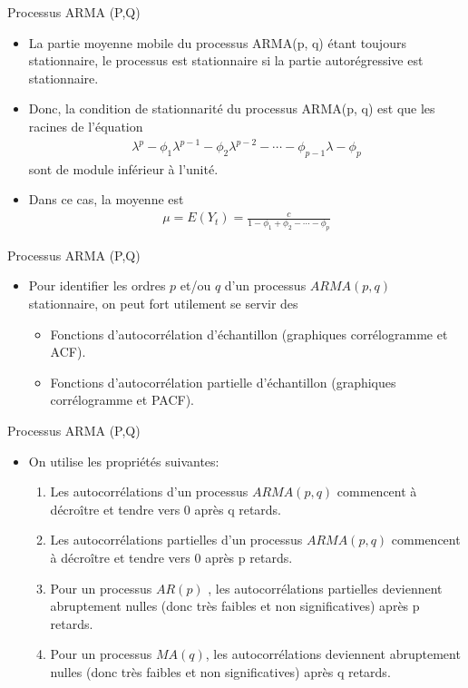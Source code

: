 \documentclass{beamer}
\begin{document}
\begin{frame}{Processus ARMA (P,Q)}
\begin{itemize}
\item La partie moyenne mobile du processus ARMA(p, q) étant toujours stationnaire, le processus est stationnaire si la partie autorégressive est stationnaire.
\item Donc, la condition de stationnarité du processus ARMA(p, q) est que les racines de l’équation
\begin{align*}
\lambda^p-\phi_1\lambda^{p-1}-\phi_2\lambda^{p-2}-\cdots -\phi_{p-1}\lambda-\phi_p
\end{align*}
sont de module inférieur à l’unité.
\item Dans ce cas, la moyenne est 
\begin{align*}
\mu=E(Y_t)=\frac{c}{1-\phi_1+\phi_2-\cdots-\phi_p}
\end{align*}
\end{itemize}
\end{frame}


\begin{frame}{Processus ARMA (P,Q)}
\begin{itemize}
\item Pour identifier les ordres $p$ et/ou $q$ d’un processus $ARMA(p,q)$ stationnaire, on peut fort utilement se servir des 
\begin{itemize}
\item Fonctions d’autocorrélation d’échantillon (graphiques corrélogramme et ACF). 
\item Fonctions d’autocorrélation partielle d’échantillon (graphiques corrélogramme et PACF). 

\end{itemize}
\end{itemize}
\end{frame}

\begin{frame}{Processus ARMA (P,Q)}
\begin{itemize}
\item On utilise les propriétés suivantes:
\begin{enumerate}
\item Les autocorrélations d’un processus $ARMA(p,q)$ commencent à décroître et tendre vers 0 après q retards.
\item Les autocorrélations partielles d’un processus $ARMA(p,q)$ commencent à décroître et tendre vers 0 après p retards.
\item Pour un processus $AR(p)$ , les autocorrélations partielles deviennent abruptement nulles (donc très faibles et non significatives) après p retards.
\item Pour un processus $MA(q)$, les autocorrélations deviennent abruptement nulles (donc très faibles et non significatives) après q retards.
\end{enumerate}
\end{itemize}
\end{frame}
\end{document}
